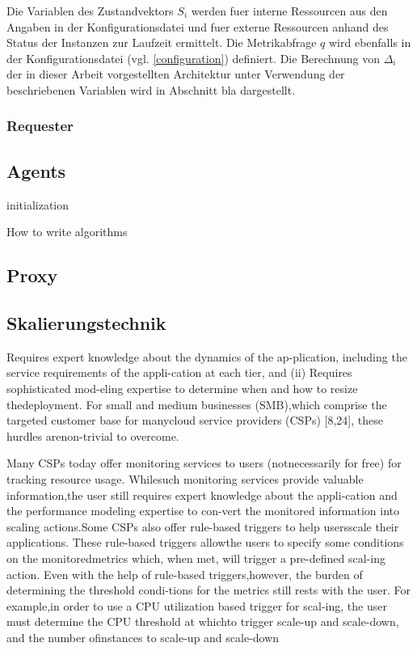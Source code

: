 \documentclass[runningheads]{llncs}
\begin{document}
Die Variablen des Zustandvektors $S_{i}$ werden fuer interne Ressourcen aus den Angaben in der Konfigurationsdatei und fuer externe Ressourcen anhand des Status der Instanzen zur Laufzeit ermittelt. Die Metrikabfrage $q$ wird ebenfalls in der Konfigurationsdatei (vgl. \ref{configuration}) definiert. Die Berechnung von $\Delta _{i}$ der in dieser Arbeit vorgestellten Architektur unter Verwendung der beschriebenen Variablen wird in Abschnitt bla dargestellt. 
	
\subsubsection{Requester}
	
\subsection{Agents}

\begin{algorithm}[H]
	\SetAlgoLined
	initialization\;
	\caption{How to write algorithms}
\end{algorithm}
	
\subsection{Proxy}

\subsection{Skalierungstechnik} \label{skalierungstechnik}

Requires expert knowledge about the dynamics of the ap-plication, including the service requirements of the appli-cation at each tier, and (ii) Requires sophisticated mod-eling expertise to determine when and how to resize thedeployment. For small and medium businesses (SMB),which comprise the targeted customer base for manycloud service providers (CSPs) [8,24], these hurdles arenon-trivial to overcome.

Many CSPs today offer monitoring services to users (notnecessarily for free) for tracking resource usage. Whilesuch monitoring services provide valuable information,the user still requires expert knowledge about the appli-cation and the performance modeling expertise to con-vert the monitored information into scaling actions.Some CSPs also offer rule-based triggers to help usersscale their applications. These rule-based triggers allowthe users to specify some conditions on the monitoredmetrics which, when met, will trigger a pre-defined scal-ing action.  Even with the help of rule-based triggers,however, the burden of determining the threshold condi-tions for the metrics still rests with the user. For example,in order to use a CPU utilization based trigger for scal-ing, the user must determine the CPU threshold at whichto trigger scale-up and scale-down, and the number ofinstances to scale-up and scale-down
\end{document}
